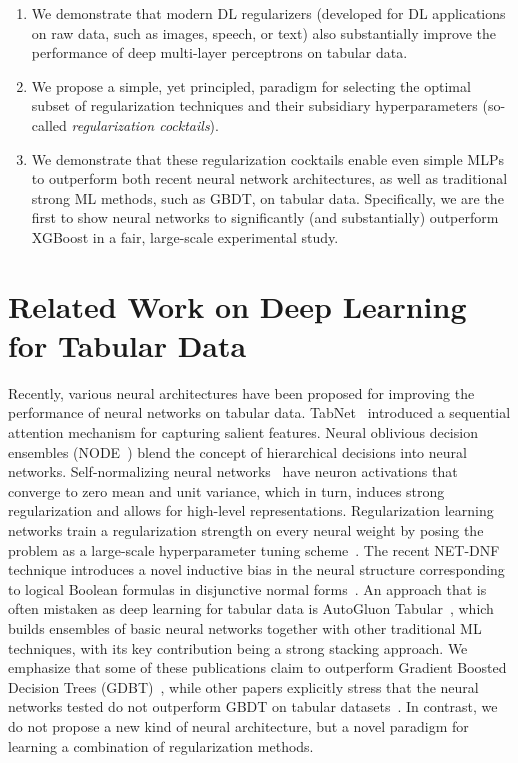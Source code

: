 \begin{enumerate}
\itemsep 0pt\topsep-10pt\partopsep-10pt
    \item We demonstrate that modern DL regularizers (developed for DL applications on raw data, such as images, speech, or text) also substantially improve the performance of deep multi-layer perceptrons on tabular data.
    \item We propose a simple, yet principled, paradigm for selecting the optimal subset of regularization techniques and their subsidiary hyperparameters (so-called \emph{regularization cocktails}).

    \item We demonstrate that these regularization cocktails enable even simple MLPs to outperform both recent neural network architectures, as well as traditional strong ML methods, such as GBDT, on tabular data. Specifically, we are the first to show neural networks to significantly (and substantially) outperform XGBoost in a fair, large-scale experimental study.

\end{enumerate}

\section{Related Work on Deep Learning for Tabular Data}

\label{sec:relatedwork}

Recently, various neural architectures have been proposed for improving the performance of neural networks on tabular data. TabNet~\citep{49698} introduced a sequential attention mechanism for capturing salient features. Neural oblivious decision ensembles (NODE~\citep{Popov2020Neural}) blend the concept of hierarchical decisions into neural networks. Self-normalizing neural networks~\citep{klambauer2017self} have neuron activations that converge to zero mean and unit variance, which in turn, induces strong regularization and allows for high-level representations. Regularization learning networks train a regularization strength on every neural weight by posing the problem as a large-scale hyperparameter tuning scheme~\citep{10.5555/3326943.3327070}. The recent NET-DNF technique introduces a novel inductive bias in the neural structure corresponding to logical Boolean formulas in disjunctive normal forms~\citep{katzir2021netdnf}. An approach that is often mistaken as deep learning for tabular data is AutoGluon Tabular~\citep{DBLP:journals/corr/abs-2003-06505}, which builds ensembles of basic neural networks together with other traditional ML techniques, with its key contribution being a strong stacking approach. We emphasize that some of these publications claim to outperform Gradient Boosted Decision Trees (GDBT)~\citep{49698,Popov2020Neural}, while other papers explicitly stress that the neural networks tested do not outperform GBDT on tabular datasets~\citep{10.5555/3326943.3327070, katzir2021netdnf}. In contrast, we do not propose a new kind of neural architecture, but a novel paradigm for learning a combination of regularization methods.

